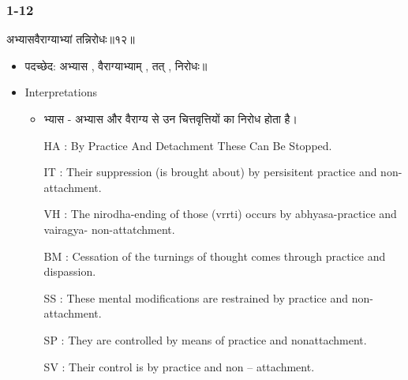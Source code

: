 \begin{frame}[fragile]\frametitle{1-12}
\begin{sanskrit}
अभ्यासवैराग्याभ्यां तन्निरोधः॥१२॥
\end{sanskrit}

	\begin{itemize}
	\item पदच्छेद: अभ्यास , वैराग्याभ्याम् , तत् , निरोधः॥
	\item Interpretations
		\begin{itemize}		
		\item भ्यास - अभ्यास और वैराग्य से उन चित्तवृत्तियों का निरोध होता है।
		\item [HA]: By Practice And Detachment These Can Be Stopped.
		\item [IT]: Their suppression (is brought about) by persisitent practice and non-attachment.
		\item [VH]: The nirodha-ending of those (vrrti) occurs by abhyasa-practice and vairagya- non-attatchment.
		\item [BM]: Cessation of the turnings of thought comes through practice and dispassion.
		\item [SS]: These mental modifications are restrained by practice and non-attachment.
		\item [SP]: They are controlled by means of practice and nonattachment.
		\item [SV]: Their control is by practice and non – attachment.
		\end{itemize}
	\end{itemize}
	
\end{frame}


